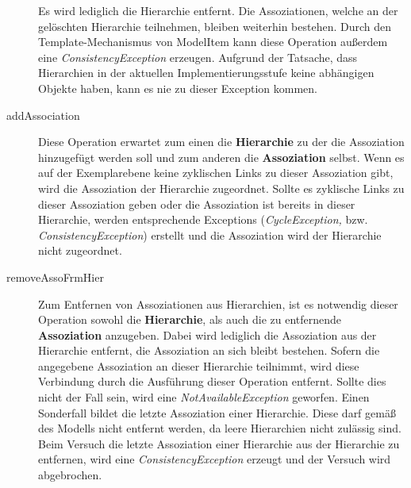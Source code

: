 \begin{description}
Es wird lediglich die Hierarchie entfernt. Die Assoziationen, welche an der gelöschten Hierarchie teilnehmen, bleiben weiterhin bestehen. Durch den Template-Mechanismus von ModelItem kann diese Operation außerdem eine \emph{ConsistencyException} erzeugen. Aufgrund der Tatsache, dass Hierarchien in der aktuellen Implementierungsstufe keine abhängigen Objekte haben, kann es nie zu dieser Exception kommen.
\item[addAssociation] Diese Operation erwartet zum einen die \textbf{Hierarchie} zu der die Assoziation hinzugefügt werden soll und zum anderen die \textbf{Assoziation} selbst.
Wenn es auf der Exemplarebene keine zyklischen Links zu dieser Assoziation gibt, wird die Assoziation der Hierarchie zugeordnet. Sollte es zyklische Links
zu dieser Assoziation geben oder die Assoziation ist bereits in dieser Hierarchie, werden entsprechende Exceptions (\emph{CycleException,} bzw. \emph{ConsistencyException}) 
erstellt und die Assoziation wird der Hierarchie nicht zugeordnet.
\item[removeAssoFrmHier] Zum Entfernen von Assoziationen aus Hierarchien, ist es notwendig dieser Operation sowohl die \textbf{Hierarchie}, als auch die zu entfernende 
\textbf{Assoziation} anzugeben. Dabei wird lediglich die Assoziation aus der Hierarchie entfernt, die Assoziation an sich bleibt bestehen. 
Sofern die angegebene Assoziation an dieser Hierarchie teilnimmt, wird diese Verbindung durch die Ausführung dieser Operation entfernt. 
Sollte dies nicht der Fall sein, wird eine \emph{NotAvailableException} geworfen. Einen Sonderfall bildet die letzte Assoziation einer
Hierarchie. Diese darf gemäß des Modells nicht entfernt werden, da leere Hierarchien nicht zulässig sind. Beim Versuch die letzte
Assoziation einer Hierarchie aus der Hierarchie zu entfernen, wird eine \emph{ConsistencyException} erzeugt und der Versuch wird abgebrochen. 
\end{description}